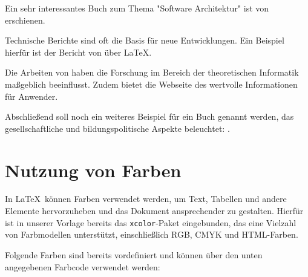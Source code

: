 Ein sehr interessantes Buch zum Thema "Software Architektur" ist von
\textcite{headFirstSoftwareArchitecture} erschienen.

Technische Berichte sind oft die Basis für neue Entwicklungen. Ein Beispiel
hierfür ist der Bericht von \textcite{lamport1994latex} über LaTeX.

Die Arbeiten von \textcite{turing1936thesis} haben die Forschung im Bereich der
theoretischen Informatik maßgeblich beeinflusst. Zudem bietet die Webseite des
\textcite{latexproject} wertvolle Informationen für Anwender.

Abschließend soll noch ein weiteres Beispiel für ein Buch genannt werden, das
gesellschaftliche und bildungspolitische Aspekte beleuchtet:
\textcite{golden2019book}.



\section*{Nutzung von Farben}

In \LaTeX\ können Farben verwendet werden, um Text, Tabellen und andere Elemente
hervorzuheben und das Dokument ansprechender zu gestalten. Hierfür ist in
unserer Vorlage bereits das \texttt{xcolor}-Paket eingebunden, das eine Vielzahl
von Farbmodellen unterstützt, einschließlich RGB, CMYK und HTML-Farben.

Folgende Farben sind bereits vordefiniert und können über den unten angegebenen
Farbcode verwendet werden:

